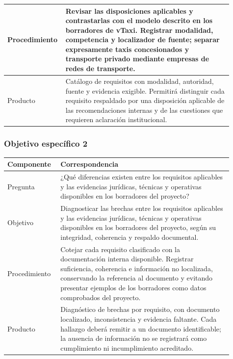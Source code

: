 {\begin{longtable}{p{0.19\linewidth}p{0.72\linewidth}}
Procedimiento & Revisar las disposiciones aplicables y contrastarlas con el modelo descrito en los borradores de vTaxi. Registrar modalidad, competencia y localizador de fuente; separar expresamente taxis concesionados y transporte privado mediante empresas de redes de transporte. \\ \hline

Producto & Catálogo de requisitos con modalidad, autoridad, fuente y evidencia exigible. Permitirá distinguir cada requisito respaldado por una disposición aplicable de las recomendaciones internas y de las cuestiones que requieren aclaración institucional. \\ \hline

\end{longtable}

\subsubsection{Objetivo específico 2}

\begin{longtable}{p{0.19\linewidth}p{0.72\linewidth}}

\textbf{Componente} & \textbf{Correspondencia} \\ \hline\endhead

Pregunta & ¿Qué diferencias existen entre los requisitos aplicables y las evidencias jurídicas, técnicas y operativas disponibles en los borradores del proyecto? \\ \hline

Objetivo & Diagnosticar las brechas entre los requisitos aplicables y las evidencias jurídicas, técnicas y operativas disponibles en los borradores del proyecto, según su integridad, coherencia y respaldo documental. \\ \hline

Procedimiento & Cotejar cada requisito clasificado con la documentación interna disponible. Registrar suficiencia, coherencia e información no localizada, conservando la referencia al documento y evitando presentar ejemplos de los borradores como datos comprobados del proyecto. \\ \hline

Producto & Diagnóstico de brechas por requisito, con documento localizado, inconsistencia y evidencia faltante. Cada hallazgo deberá remitir a un documento identificable; la ausencia de información no se registrará como cumplimiento ni incumplimiento acreditado. \\ \hline


\end{longtable}}
